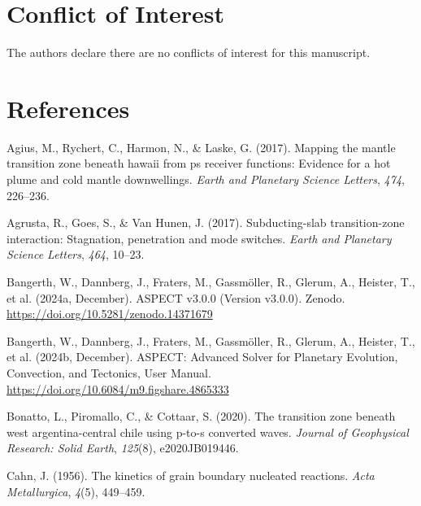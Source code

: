 \documentclass[
  paper=a4,
  ,captions=tableheading
]{scrartcl}
\newlength{\cslhangindent}
\newenvironment{CSLReferences}[2] %
  {\begin{list}{}{%
   \setlength{\itemindent}{0pt}
   \setlength{\leftmargin}{0pt}
   \setlength{\parsep}{0pt}
   \ifodd #1
    \setlength{\leftmargin}{\cslhangindent}
    \setlength{\itemindent}{-1\cslhangindent}
   \fi
   \setlength{\itemsep}{#2\baselineskip}}}
  {\end{list}}
\begin{document}
\section*{Conflict of Interest}\label{sec:conflict-of-interest}

The authors declare there are no conflicts of interest for this
manuscript.

\clearpage

\section*{References}\label{sec:references}

\protect{}\label{refs}
\begin{CSLReferences}{1}{0}
Agius, M., Rychert, C., Harmon, N., \& Laske, G. (2017). Mapping the
mantle transition zone beneath hawaii from ps receiver functions:
Evidence for a hot plume and cold mantle downwellings. \emph{Earth and
Planetary Science Letters}, \emph{474}, 226--236.

Agrusta, R., Goes, S., \& Van Hunen, J. (2017). Subducting-slab
transition-zone interaction: Stagnation, penetration and mode switches.
\emph{Earth and Planetary Science Letters}, \emph{464}, 10--23.

Bangerth, W., Dannberg, J., Fraters, M., Gassmöller, R., Glerum, A.,
Heister, T., et al. (2024a, December). ASPECT v3.0.0 (Version v3.0.0).
Zenodo. \url{https://doi.org/10.5281/zenodo.14371679}

Bangerth, W., Dannberg, J., Fraters, M., Gassmöller, R., Glerum, A.,
Heister, T., et al. (2024b, December). {{ASPECT}: Advanced Solver for
Planetary Evolution, Convection, and Tectonics, User Manual}.
\url{https://doi.org/10.6084/m9.figshare.4865333}

Bonatto, L., Piromallo, C., \& Cottaar, S. (2020). The transition zone
beneath west argentina-central chile using p-to-s converted waves.
\emph{Journal of Geophysical Research: Solid Earth}, \emph{125}(8),
e2020JB019446.

Cahn, J. (1956). The kinetics of grain boundary nucleated reactions.
\emph{Acta Metallurgica}, \emph{4}(5), 449--459.


\end{CSLReferences}
\end{document}
